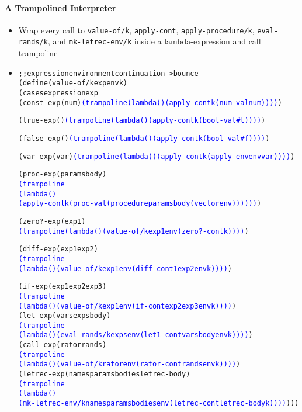 \documentclass{beamer}
\begin{document}
\begin{frame}[fragile]
\framesubtitle{A Trampolined Interpreter}
\begin{tiny}
\begin{itemize}
\item<1-> Wrap every call to \texttt{value-of/k}, \texttt{apply-cont}, \texttt{apply-procedure/k}, \texttt{eval-rands/k}, and \texttt{mk-letrec-env/k} inside a lambda-expression and call trampoline

\item<1->
\begin{alltt}
;; expression environment continuation -> bounce
(define (value-of/k exp env k)
  (cases expression exp
    (const-exp (num) \textcolor{blue}{(trampoline (lambda () (apply-cont k (num-val num))))})
    
    (true-exp () \textcolor{blue}{(trampoline (lambda () (apply-cont k (bool-val #t))))})
    
    (false-exp () \textcolor{blue}{(trampoline (lambda () (apply-cont k (bool-val #f))))})
    
    (var-exp (var) \textcolor{blue}{(trampoline (lambda () (apply-cont k (apply-env env var))))})
    
    (proc-exp (params body)
              \textcolor{blue}{(trampoline
               (lambda ()
                 (apply-cont k (proc-val (procedure params body (vector env))))))})

    (zero?-exp (exp1)
               \textcolor{blue}{(trampoline (lambda () (value-of/k exp1 env (zero?-cont k))))})

    (diff-exp (exp1 exp2)
              \textcolor{blue}{(trampoline
               (lambda () (value-of/k exp1 env (diff-cont1 exp2 env k))))})

    (if-exp (exp1 exp2 exp3)
            \textcolor{blue}{(trampoline
             (lambda () (value-of/k exp1 env (if-cont exp2 exp3 env k))))})
    (let-exp (vars exps body)
             \textcolor{blue}{(trampoline
              (lambda () (eval-rands/k exps env (let1-cont vars body env k))))})
    (call-exp (rator rands)
              \textcolor{blue}{(trampoline
               (lambda () (value-of/k rator env (rator-cont rands env k))))})
    (letrec-exp (names params bodies letrec-body)
                \textcolor{blue}{(trampoline
                 (lambda ()
                   (mk-letrec-env/k names params bodies env (letrec-cont letrec-body k))))})))

\end{alltt}

\end{itemize}
\end{tiny}
\end{frame}
\end{document}
